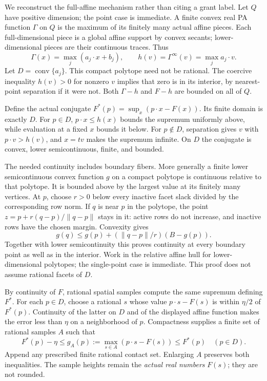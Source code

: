 \documentclass[
  11pt,
]{article}
\begin{document}
We reconstruct the full-affine mechanism rather than citing a grant
label. Let \(Q\) have positive dimension; the point case is immediate. A
finite convex real PA function \(\Gamma\) on \(Q\) is the maximum of its
finitely many actual affine pieces. Each full-dimensional piece is a
global affine support by convex secants; lower-dimensional pieces are
their continuous traces. Thus \[ \Gamma(x)=\max_j(a_j\cdot x+b_j),\qquad
h(v)=\Gamma^\infty(v)=\max_j a_j\cdot v. \] Let
\(D=\operatorname{conv}\{a_j\}\). This compact polytope need not be
rational. The coercive inequality \(h(v)>0\) for nonzero \(v\) implies
that zero is in its interior, by nearest-point separation if it were
not. Both \(\Gamma-h\) and \(F-h\) are bounded on all of \(Q\).

Define the actual conjugate \(F^*(p)=\sup_x(p\cdot x-F(x))\). Its finite
domain is exactly \(D\). For \(p\in D\), \(p\cdot x\leq h(x)\) bounds
the supremum uniformly above, while evaluation at a fixed \(x\) bounds
it below. For \(p\notin D\), separation gives \(v\) with
\(p\cdot v>h(v)\), and \(x=t v\) makes the supremum infinite. On \(D\)
the conjugate is convex, lower semicontinuous, finite, and bounded.

The needed continuity includes boundary fibers. More generally a finite
lower semicontinuous convex function \(g\) on a compact polytope is
continuous relative to that polytope. It is bounded above by the largest
value at its finitely many vertices. At \(p\), choose \(r>0\) below
every inactive facet slack divided by the corresponding row norm. If
\(q\) is near \(p\) in the polytope, the point \(z=p+r(q-p)/\|q-p\|\)
stays in it: active rows do not increase, and inactive rows have the
chosen margin. Convexity gives \[ g(q)\leq g(p)+(\|q-p\|/r)(B-g(p)). \]
Together with lower semicontinuity this proves continuity at every
boundary point as well as in the interior. Work in the relative affine
hull for lower-dimensional polytopes; the single-point case is
immediate. This proof does not assume rational facets of \(D\).

By continuity of \(F\), rational spatial samples compute the same
supremum defining \(F^*\). For each \(p\in D\), choose a rational \(s\)
whose value \(p\cdot s-F(s)\) is within \(\eta/2\) of \(F^*(p)\).
Continuity of the latter on \(D\) and of the displayed affine function
makes the error less than \(\eta\) on a neighborhood of \(p\).
Compactness supplies a finite set of rational samples \(A\) such that
\[ F^*(p)-\eta\leq g_A(p):=\max_{s\in A}(p\cdot s-F(s))\leq F^*(p)
\quad(p\in D). \] Append any prescribed finite rational contact set.
Enlarging \(A\) preserves both inequalities. The sample heights remain
the \emph{actual real numbers} \(F(s)\); they are not rounded.
\end{document}
